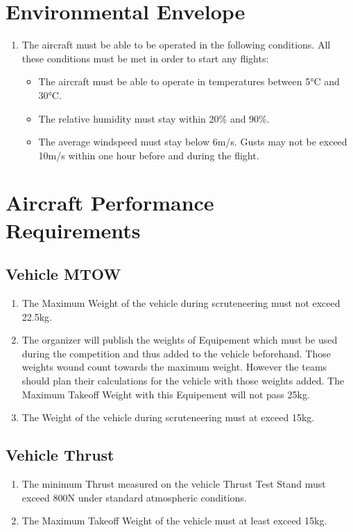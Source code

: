 \documentclass{article}
\begin{document}
\section{Environmental Envelope}
\begin{enumerate}
  \item The aircraft must be able to be operated in the following conditions. All these conditions must be met in order to start any flights:
\begin {itemize}
  \item The aircraft must be able to operate in temperatures between 5°C and 30°C.
  \item The relative humidity must stay within 20\% and 90\%. 
  \item The average windspeed must stay below 6m/s. Gusts may not be exceed 10m/s within one hour before and during the flight.
  
\end {itemize}
\end{enumerate}

\section{Aircraft Performance Requirements}

\subsection{Vehicle MTOW}
\begin{enumerate}
  \item The Maximum Weight of the vehicle during scruteneering must not exceed 22.5kg.
  \item The organizer will publish the weights of Equipement which must be used during the competition and thus added to the vehicle beforehand. Those weights wound count towards the maximum weight. 
  However the teams should plan their calculations for the vehicle with those weights added. The Maximum Takeoff Weight with this Equipement will not pass 25kg.  
  \item The Weight of the vehicle during scruteneering must at exceed 15kg.  
\end{enumerate}

\subsection{Vehicle Thrust}
\begin{enumerate}
  \item The minimum Thrust measured on the vehicle Thrust Test Stand must exceed 800N under standard atmospheric conditions. 
  \item The Maximum Takeoff Weight of the vehicle must at least exceed 15kg.  
\end{enumerate}
\end{document}
